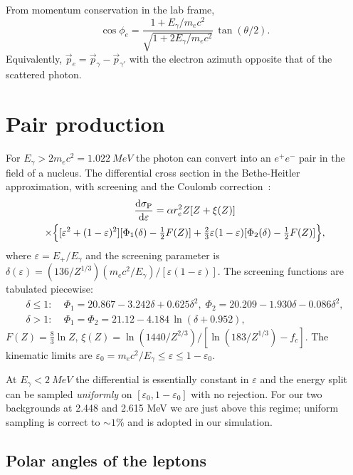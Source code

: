 \documentclass[11pt,a4paper]{article}
\newcommand{\Eg}{E_\gamma}
\newcommand{\me}{m_e c^2}
\newcommand{\re}{r_e}
\newcommand{\eps}{\varepsilon}
\begin{document}
From momentum conservation in the lab frame,
\begin{equation}
  \cos\phi_e = \frac{1+\Eg/\me}{\sqrt{1+2\Eg/\me}}\,
              \tan(\theta/2).
\end{equation}
Equivalently, $\vec p_e=\vec p_\gamma-\vec p_{\gamma'}$ with the
electron azimuth opposite that of the scattered photon.

\section{Pair production}\label{sec:pair}

For $\Eg > 2\me=\SI{1.022}{MeV}$ the photon can convert into an
$e^+e^-$ pair in the field of a nucleus. The differential cross
section in the Bethe-Heitler approximation, with screening and the
Coulomb correction~\cite{G4-PRM,Hubbell1980}:
\begin{multline}
\dv{\sigma_{\rm P}}{\eps}(Z,\eps;\Eg)
  = \alpha\re^2 Z[Z+\xi(Z)] \\
\times\Bigl\{
  [\eps^2+(1-\eps)^2]
  [\Phi_1(\delta)-\tfrac{1}{2}F(Z)]
  + \tfrac{2}{3}\eps(1-\eps)
  [\Phi_2(\delta)-\tfrac{1}{2}F(Z)]
\Bigr\},
\label{eq:BH-diff}
\end{multline}
where $\eps=E_+/\Eg$ and the screening parameter is
\(\delta(\eps) = (136/Z^{1/3})(\me/\Eg)/[\eps(1-\eps)]\).
The screening functions are tabulated piecewise:
\begin{align}
  \delta\le 1\!:\;&\Phi_1=20.867-3.242\delta+0.625\delta^2,\;
  \Phi_2=20.209-1.930\delta-0.086\delta^2,\\
  \delta>1\!:\;&\Phi_1=\Phi_2=21.12-4.184\,\ln(\delta+0.952),
\end{align}
$F(Z)=\frac{8}{3}\ln Z$, $\xi(Z)=\ln(1440/Z^{2/3})/[\ln(183/Z^{1/3})-f_c]$.
The kinematic limits are $\eps_0=\me/\Eg\le\eps\le 1-\eps_0$.

\begin{remarkbox}
At $\Eg<\SI{2}{MeV}$ the differential is essentially constant in
$\eps$ and the energy split can be sampled \emph{uniformly} on
$[\eps_0,1-\eps_0]$ with no rejection. For our two backgrounds at
2.448 and 2.615 MeV we are just above this regime; uniform sampling
is correct to $\sim 1\%$ and is adopted in our simulation.
\end{remarkbox}

\subsection{Polar angles of the leptons}
\end{document}
